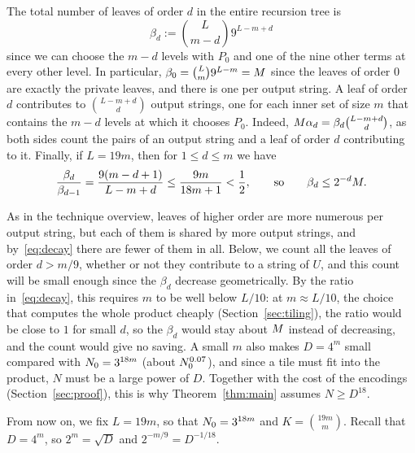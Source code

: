 The total number of leaves of order $d$ in the entire recursion tree is
\[
\beta_d:=\binom{L}{m-d}9^{L-m+d}
\]
since we can choose the $m-d$ levels with $P_0$ and one of the nine other terms at every other level. In particular, $\beta_0=\binom Lm9^{L-m}=M$ since the leaves of order $0$ are exactly the private leaves, and there is one per output string. A leaf of order $d$ contributes to $\binom{L-m+d}{d}$ output strings, one for each inner set of size $m$ that contains the $m-d$ levels at which it chooses $P_0$. Indeed, $M\alpha_d=\beta_d\binom{L-m+d}{d}$, as both sides count the pairs of an output string and a leaf of order $d$ contributing to it. Finally, if $L=19m$, then for $1\le d\le m$ we have
\begin{equation}\label{eq:decay}
\frac{\beta_d}{\beta_{d-1}}=\frac{9(m-d+1)}{L-m+d}\le\frac{9m}{18m+1}<\frac12,\qquad\text{so}\qquad \beta_d\le2^{-d}M .
\end{equation}

As in the technique overview, leaves of higher order are more numerous per output string, but each of them is shared by more output strings, and by~\eqref{eq:decay} there are fewer of them in all. Below, we count all the leaves of order $d>m/9$, whether or not they contribute to a string of $U$, and this count will be small enough since the $\beta_d$ decrease geometrically. By the ratio in~\eqref{eq:decay}, this requires $m$ to be well below $L/10$: at $m\approx L/10$, the choice that computes the whole product cheaply (Section~\ref{sec:tiling}), the ratio would be close to $1$ for small $d$, so the $\beta_d$ would stay about $M$ instead of decreasing, and the count would give no saving. A small $m$ also makes $D=4^m$ small compared with $N_0=3^{18m}$ (about $N_0^{0.07}$), and since a tile must fit into the product, $N$ must be a large power of $D$. Together with the cost of the encodings (Section~\ref{sec:proof}), this is why Theorem~\ref{thm:main} assumes $N\ge D^{18}$.

From now on, we fix $L=19m$, so that $N_0=3^{18m}$ and $K=\binom{19m}m$. Recall that $D=4^m$, so $2^m=\sqrt D$ and $2^{-m/9}=D^{-1/18}$.

